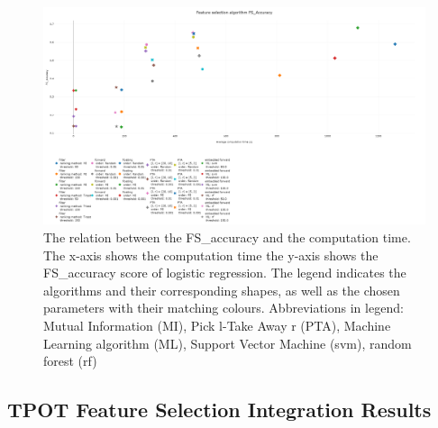 \begin{figure}[H]
	\centering
	\includegraphics[angle=90,height=1.4\textwidth]{FS_Accuracy_99.png}
	\caption{The relation between the FS\_accuracy and the computation time. The x-axis shows the computation time the y-axis shows the FS\_accuracy score of logistic regression. The legend indicates the algorithms and their corresponding shapes, as well as the chosen parameters with their matching colours. Abbreviations in legend: Mutual Information (MI), Pick l-Take Away r (PTA), Machine Learning algorithm (ML), Support Vector Machine (svm), random forest (rf)}
	\label{fig:Comp_Time_FS_Acc}
\end{figure}
	
	\subsection{TPOT Feature Selection Integration Results}
	

